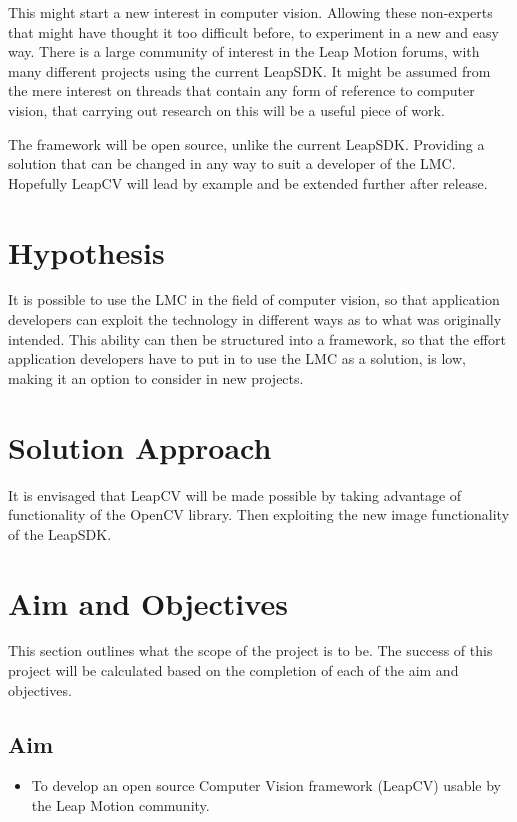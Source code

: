 \documentclass[11pt,oneside]{report}
\begin{document}
				This might start a new interest in computer vision.
				Allowing these non-experts that might have thought it too difficult before, to experiment in a new and easy way.
				There is a large community of interest in the Leap Motion forums, with many different projects using the current LeapSDK.
				It might be assumed from the mere interest on threads that contain any form of reference to computer vision, that carrying out research on this will be a useful piece of work.
				
				The framework will be open source, unlike the current LeapSDK.
				Providing a solution that can be changed in any way to suit a developer of the LMC.
				Hopefully LeapCV will lead by example and be extended further after release.
		\section{Hypothesis}
				It is possible to use the LMC in the field of computer vision, so that application developers can exploit the technology in different ways as to what was originally intended.	
				This ability can then be structured into a framework, so that the effort application developers have to put in to use the LMC as a solution, is low, making it an option to consider in new projects.	
		\section{Solution Approach}	
			It is envisaged that LeapCV will be made possible by taking advantage of functionality of the OpenCV library.
			Then exploiting the new image functionality of the LeapSDK.
								
		\section{Aim and Objectives} 
		This section outlines what the scope of the project is to be.
		The success of this project will be calculated based on the completion of each of the aim and objectives.
		\subsection{Aim}
		\begin{itemize}
			\item To develop an open source Computer Vision framework (LeapCV) usable by the Leap Motion community.
		\end{itemize}
\end{document}
